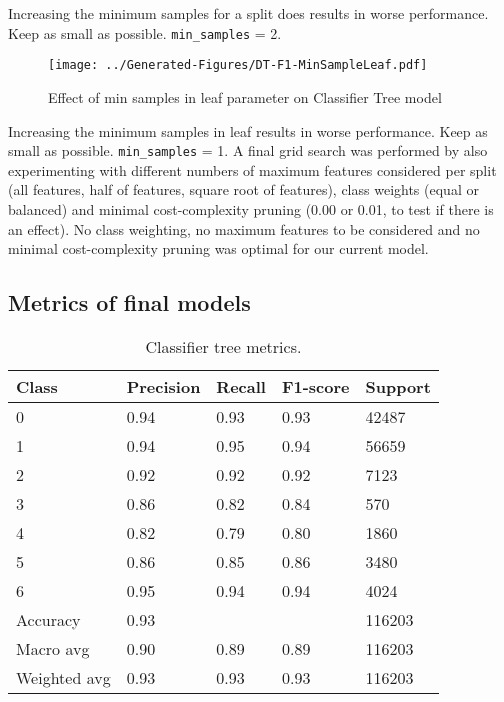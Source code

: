 \documentclass[conference]{IEEEtran}
\begin{document}
Increasing the minimum samples for a split does results in worse performance. Keep as small as possible. \texttt{min\_samples} = 2.

\begin{figure}[H]
	\centering
	\begin{minipage}{0.45\textwidth}
		\centering
		\texttt{[image: ../Generated-Figures/DT-F1-MinSampleLeaf.pdf]}
		\caption{Effect of min samples in leaf parameter on Classifier Tree model}
		\label{fig:sampleleaf}
	\end{minipage}
\end{figure}

Increasing the minimum samples in leaf results in worse performance. Keep as small as possible. \texttt{min\_samples} = 1. A final grid search was performed by also experimenting with different numbers of maximum features considered per split (all features, half of features, square root of features), class weights (equal or balanced) and minimal cost-complexity pruning (0.00 or 0.01, to test if there is an effect). No class weighting, no maximum features to be considered and no minimal cost-complexity pruning was optimal for our current model.

\subsection{Metrics of final models}

\begin{table}[htbp]
	\centering
	\begin{tabular}{lllll}
		\toprule
		\textbf{Class} & \textbf{Precision} & \textbf{Recall} & \textbf{F1-score} & \textbf{Support} \\
		\midrule
		0 & 0.94 & 0.93 & 0.93 & 42487 \\
		1 & 0.94 & 0.95 & 0.94 & 56659 \\
		2 & 0.92 & 0.92 & 0.92 & 7123 \\
		3 & 0.86 & 0.82 & 0.84 & 570 \\
		4 & 0.82 & 0.79 & 0.80 & 1860 \\
		5 & 0.86 & 0.85 & 0.86 & 3480 \\
		6 & 0.95 & 0.94 & 0.94 & 4024 \\
		\midrule
		Accuracy & 0.93 & & & 116203 \\
		Macro avg & 0.90 & 0.89 & 0.89 & 116203 \\
		Weighted avg & 0.93 & 0.93 & 0.93 & 116203 \\
		\bottomrule
	\end{tabular}
	\caption{Classifier tree metrics.}
	\label{tab:tree-result}
\end{table}
\end{document}
